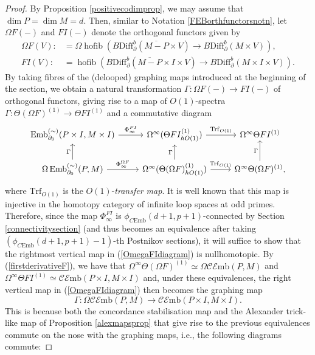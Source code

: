 \documentclass[a4paper, oneside]{amsart}
\newcommand{\diff}{\mathrm{Diff}}
\newcommand{\hofib}{\operatorname{hofib}}
\newcommand{\cemb}{C\mathrm{Emb}}
\newcommand{\1}{\mathds{1}}
\theoremstyle{remark}
\theoremstyle{definition}
\newcommand{\pemb}{\operatorname{Emb}^{(\sim)}}
\numberwithin{equation}{section}
\begin{document}
\begin{proof}
By Proposition \ref{positivecodimprop}, we may assume that $\dim P=\dim M=d$. Then, similar to Notation \ref{FEBorthfunctorsnotn}, let $\Omega F(-)$ and $FI(-)$ denote the orthogonal functors given by
\begin{align*}
\Omega F(V):&=\Omega\hofib(B\diff^b_\partial(\overline{M-P}\times V)\to B\diff^b_\partial(M\times V)),\\
FI(V):&=\hofib(B\diff^b_\partial(\overline{M-P}\times I\times V)\to B\diff^b_\partial(M\times I\times V)).
\end{align*}
By taking fibres of the (delooped) graphing maps introduced at the beginning of the section, we obtain a natural transformation $\Gamma: \Omega F(-)\to FI(-)$ of orthogonal functors, giving rise to a map of $O(1)$-spectra $\Gamma: \Theta(\Omega F)^{(1)}\longrightarrow \Theta FI^{(1)}$ and a commutative diagram
\begin{equation}\label{OmegaFIdiagram}
\begin{tikzcd}
\pemb_{\partial_0}(P\times I, M\times I)\rar["\Phi^{FI}_\infty"] & \Omega^\infty(\Theta FI^{(1)}_{hO(1)})\rar["\mathrm{Trf}_{O(1)}"] & \Omega^\infty\Theta FI^{(1)}\\
\Omega\pemb_{\partial_0}(P, M)\uar["\Gamma"]\rar[" \Phi^{\Omega F}_\infty"] & \Omega^\infty(\Theta (\Omega F)^{(1)}_{hO(1)})\uar["\Gamma"]\rar["\mathrm{Trf}_{O(1)}"] & \Omega^\infty\Theta(\Omega F)^{(1)}\uar["\Gamma"],
\end{tikzcd}
\end{equation}
where $\mathrm{Trf}_{O(1)}$ is the $O(1)$-\textit{transfer map}. It is well known that this map is injective in the homotopy category of infinite loop spaces at odd primes. Therefore, since the map $\Phi^{FI}_\infty$ is $\phi_{\cemb}(d+1,p+1)$-connected by Section \ref{connectivitysection} (and thus becomes an equivalence after taking $(\phi_{\cemb}(d+1,p+1)-1)$-th Postnikov sections), it will suffice to show that the rightmost vertical map in (\ref{OmegaFIdiagram}) is nullhomotopic. By (\ref{firstderivativeF}), we have that $\Omega^\infty\Theta(\Omega F)^{(1)}\simeq \Omega\mathcal{CE}\mathrm{mb}(P,M)$ and $\Omega^\infty\Theta FI^{(1)}\simeq \mathcal{CE}\mathrm{mb}(P\times I,M\times I)$ and, under these equivalences, the right vertical map in (\ref{OmegaFIdiagram}) then becomes the graphing map
\begin{equation}\label{splittingpropstablecembmap}
\Gamma: \Omega\mathcal{CE}\mathrm{mb}(P,M)\longrightarrow \mathcal{CE}\mathrm{mb}(P\times I,M\times I).
\end{equation}
This is because both the concordance stabilisation map and the Alexander trick-like map of Proposition \ref{alexmapsprop} that give rise to the previous equivalences commute on the nose with the graphing maps, i.e., the following diagrams commute:

\end{proof}
\end{document}
